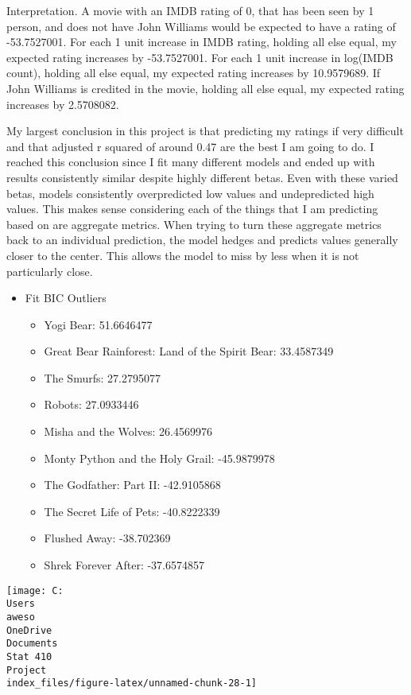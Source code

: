 \documentclass[
]{article}
\providecommand{\tightlist}{%
  \setlength{\itemsep}{0pt}\setlength{\parskip}{0pt}}
\begin{document}
Interpretation. A movie with an IMDB rating of 0, that has been seen by
1 person, and does not have John Williams would be expected to have a
rating of -53.7527001. For each 1 unit increase in IMDB rating, holding
all else equal, my expected rating increases by -53.7527001. For each 1
unit increase in log(IMDB count), holding all else equal, my expected
rating increases by 10.9579689. If John Williams is credited in the
movie, holding all else equal, my expected rating increases by
2.5708082.

My largest conclusion in this project is that predicting my ratings if
very difficult and that adjusted r squared of around 0.47 are the best I
am going to do. I reached this conclusion since I fit many different
models and ended up with results consistently similar despite highly
different betas. Even with these varied betas, models consistently
overpredicted low values and undepredicted high values. This makes sense
considering each of the things that I am predicting based on are
aggregate metrics. When trying to turn these aggregate metrics back to
an individual prediction, the model hedges and predicts values generally
closer to the center. This allows the model to miss by less when it is
not particularly close.

\begin{itemize}
\tightlist
\item
  Fit BIC Outliers

  \begin{itemize}
  \tightlist
  \item
    Yogi Bear: 51.6646477
  \item
    Great Bear Rainforest: Land of the Spirit Bear: 33.4587349
  \item
    The Smurfs: 27.2795077
  \item
    Robots: 27.0933446
  \item
    Misha and the Wolves: 26.4569976
  \item
    Monty Python and the Holy Grail: -45.9879978
  \item
    The Godfather: Part II: -42.9105868
  \item
    The Secret Life of Pets: -40.8222339
  \item
    Flushed Away: -38.702369
  \item
    Shrek Forever After: -37.6574857
  \end{itemize}
\end{itemize}

\texttt{[image: C:\\Users\\aweso\\OneDrive\\Documents\\Stat 410\\Project\\index\_files/figure-latex/unnamed-chunk-28-1]}
\end{document}
